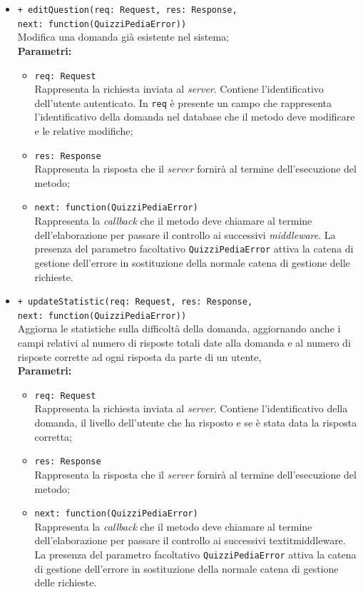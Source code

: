 \begin{itemize}
\begin{itemize}
				\item \texttt{+ editQuestion(req: Request, res: Response,\\ next: function(QuizziPediaError))} \\
				Modifica una domanda già esistente nel sistema; \\
				\textbf{Parametri:}
					\begin{itemize}
						\item \texttt{req: Request} \\
						Rappresenta la richiesta inviata al \textit{server}. Contiene l'identificativo dell'utente autenticato. In \texttt{req} è presente un campo che rappresenta l'identificativo della domanda nel database che il metodo deve modificare e le relative modifiche;
						\item \texttt{res: Response} \\
						Rappresenta la risposta che il \textit{server} fornirà al termine dell'esecuzione del metodo;
						\item \texttt{next: function(QuizziPediaError)} \\
						Rappresenta la \textit{callback} che il metodo deve chiamare al termine dell'elaborazione per passare il controllo ai successivi \textit{middleware}. La presenza del parametro facoltativo \texttt{QuizziPediaError} attiva la catena di gestione dell'errore in sostituzione della normale catena di gestione delle richieste.
					\end{itemize}
				\item \texttt{+ updateStatistic(req: Request, res: Response,\\ next: function(QuizziPediaError))} \\
				Aggiorna le statistiche sulla difficoltà della domanda, aggiornando anche i campi relativi al numero di risposte totali date alla domanda e al numero di risposte corrette ad ogni risposta da parte di un utente, \\
				\textbf{Parametri:}
					\begin{itemize}
						\item \texttt{req: Request} \\
						Rappresenta la richiesta inviata al \textit{server}. Contiene l'identificativo della domanda, il livello dell'utente che ha risposto e se è stata data la risposta corretta;
						\item \texttt{res: Response} \\
						Rappresenta la risposta che il \textit{server} fornirà al termine dell'esecuzione del metodo;
						\item \texttt{next: function(QuizziPediaError)} \\
						Rappresenta la \textit{callback} che il metodo deve chiamare al termine dell'elaborazione per passare il controllo ai successivi textit{middleware}. La presenza del parametro facoltativo \texttt{QuizziPediaError} attiva la catena di gestione dell'errore in sostituzione della normale catena di gestione delle richieste.
					\end{itemize}
			\end{itemize}
	\end{itemize}